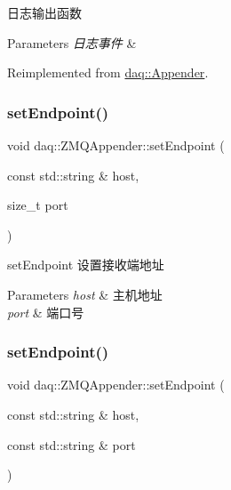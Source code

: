 日志输出函数 


\begin{DoxyParams}{Parameters}
{\em 日志事件} & \\
\hline
\end{DoxyParams}


Reimplemented from \hyperlink{classdaq_1_1Appender_a66e8f896daf7ad4a82769949b351b994}{daq\+::\+Appender}.

\mbox{\label{classdaq_1_1ZMQAppender_a0d330bf4e03d7cce1f13e1be1fdf5581}} 
\subsubsection{\texorpdfstring{set\+Endpoint()}{setEndpoint()}\hspace{0.1cm}{\footnotesize\ttfamily [1/2]}}
{\footnotesize\ttfamily void daq\+::\+Z\+M\+Q\+Appender\+::set\+Endpoint (\begin{DoxyParamCaption}\item[{const std\+::string \&}]{host,  }\item[{size\+\_\+t}]{port }\end{DoxyParamCaption})\hspace{0.3cm}{\ttfamily [inline]}}



set\+Endpoint 设置接收端地址 


\begin{DoxyParams}{Parameters}
{\em host} & 主机地址 \\
\hline
{\em port} & 端口号 \\
\hline
\end{DoxyParams}
\mbox{\label{classdaq_1_1ZMQAppender_a04132ad59cf83f8555f6fb6a4f8993d6}} 
\subsubsection{\texorpdfstring{set\+Endpoint()}{setEndpoint()}\hspace{0.1cm}{\footnotesize\ttfamily [2/2]}}
{\footnotesize\ttfamily void daq\+::\+Z\+M\+Q\+Appender\+::set\+Endpoint (\begin{DoxyParamCaption}\item[{const std\+::string \&}]{host,  }\item[{const std\+::string \&}]{port }\end{DoxyParamCaption})\hspace{0.3cm}{\ttfamily [inline]}}



